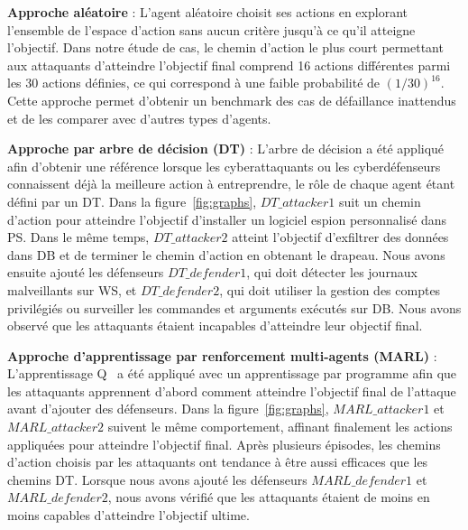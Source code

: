 


\noindent
\textbf{Approche aléatoire} : \quad L'agent aléatoire choisit ses actions en explorant l'ensemble de l'espace d'action sans aucun critère jusqu'à ce qu'il atteigne l'objectif. Dans notre étude de cas, le chemin d'action le plus court permettant aux attaquants d'atteindre l'objectif final comprend 16 actions différentes parmi les 30 actions définies, ce qui correspond à une faible probabilité de $(1/30)^{16}$.
Cette approche permet d'obtenir un benchmark des cas de défaillance inattendus et de les comparer avec d'autres types d'agents.

\noindent
\textbf{Approche par arbre de décision (DT) } : \quad L'arbre de décision a été appliqué afin d'obtenir une référence lorsque les cyberattaquants ou les cyberdéfenseurs connaissent déjà la meilleure action à entreprendre, le rôle de chaque agent étant défini par un DT.
Dans la figure~\ref{fig:graphs}, $DT\_attacker1$ suit un chemin d'action pour atteindre l'objectif d'installer un logiciel espion personnalisé dans PS. Dans le même temps, $DT\_attacker2$ atteint l'objectif d'exfiltrer des données dans DB et de terminer le chemin d'action en obtenant le drapeau. Nous avons ensuite ajouté les défenseurs $DT\_defender1$, qui doit détecter les journaux malveillants sur WS, et $DT\_defender2$, qui doit utiliser la gestion des comptes privilégiés ou surveiller les commandes et arguments exécutés sur DB. Nous avons observé que les attaquants étaient incapables d'atteindre leur objectif final.

\noindent
\textbf{Approche d'apprentissage par renforcement multi-agents (MARL)} : \quad L'apprentissage Q~\cite{CWatkins1992} a été appliqué avec un apprentissage par programme afin que les attaquants apprennent d'abord comment atteindre l'objectif final de l'attaque avant d'ajouter des défenseurs.
Dans la figure~\ref{fig:graphs}, $MARL\_attacker1$ et $MARL\_attacker2$ suivent le même comportement, affinant finalement les actions appliquées pour atteindre l'objectif final. Après plusieurs épisodes, les chemins d'action choisis par les attaquants ont tendance à être aussi efficaces que les chemins DT. Lorsque nous avons ajouté les défenseurs $MARL\_defender1$ et $MARL\_defender2$, nous avons vérifié que les attaquants étaient de moins en moins capables d'atteindre l'objectif ultime.


